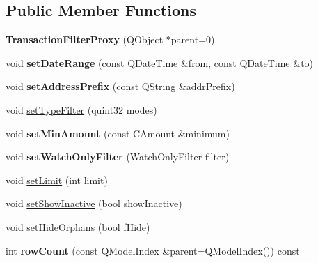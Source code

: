 \subsection*{Public Member Functions}
\begin{DoxyCompactItemize}
\item 
\mbox{\label{class_transaction_filter_proxy_a9981e03a2b60931e3e5adbe7e3fb6b7d}} 
{\bfseries Transaction\+Filter\+Proxy} (Q\+Object $\ast$parent=0)
\item 
\mbox{\label{class_transaction_filter_proxy_ad57cc552db9ce70bb4e8e1c12909992d}} 
void {\bfseries set\+Date\+Range} (const Q\+Date\+Time \&from, const Q\+Date\+Time \&to)
\item 
\mbox{\label{class_transaction_filter_proxy_ad0b4258695ed1fbbf70d29f4e264361a}} 
void {\bfseries set\+Address\+Prefix} (const Q\+String \&addr\+Prefix)
\item 
void \mbox{\hyperlink{class_transaction_filter_proxy_af28eee58aee7585b71f057d044408106}{set\+Type\+Filter}} (quint32 modes)
\item 
\mbox{\label{class_transaction_filter_proxy_a14688071f18551bf7d78225feb8ca8df}} 
void {\bfseries set\+Min\+Amount} (const C\+Amount \&minimum)
\item 
\mbox{\label{class_transaction_filter_proxy_a63123114a91591249492278ba7223834}} 
void {\bfseries set\+Watch\+Only\+Filter} (Watch\+Only\+Filter filter)
\item 
void \mbox{\hyperlink{class_transaction_filter_proxy_a3ec04a38573eb59b8f246f54658d2702}{set\+Limit}} (int limit)
\item 
void \mbox{\hyperlink{class_transaction_filter_proxy_aad1598cc4308eb08d8f617f08f62ece6}{set\+Show\+Inactive}} (bool show\+Inactive)
\item 
void \mbox{\hyperlink{class_transaction_filter_proxy_a3241c3e77288149621f888342434d8ae}{set\+Hide\+Orphans}} (bool f\+Hide)
\item 
\mbox{\label{class_transaction_filter_proxy_a8bd1fab8f6b4bf5f23b8c3ac0d682552}} 
int {\bfseries row\+Count} (const Q\+Model\+Index \&parent=Q\+Model\+Index()) const
\end{DoxyCompactItemize}
